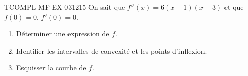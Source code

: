 \begin{exercice}{TCOMPL-MF-EX-031}{2}{15}
On sait que $f''(x) = 6(x-1)(x-3)$ et que $f(0) = 0$, $f'(0) = 0$.
\begin{enumerate}
  \item Déterminer une expression de $f$.
  \item Identifier les intervalles de convexité et les points d'inflexion.
  \item Esquisser la courbe de $f$.
\end{enumerate}

\end{exercice}
